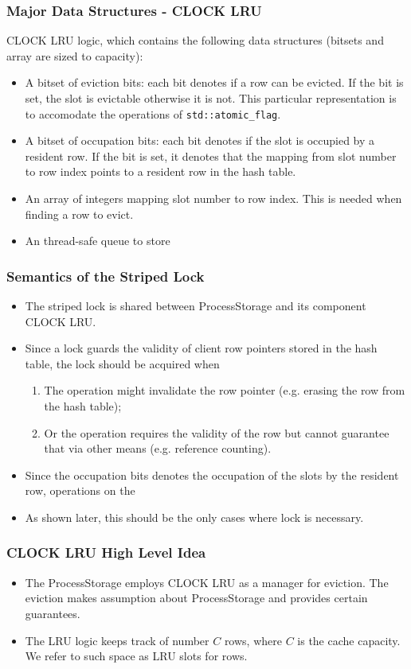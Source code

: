 \documentclass{beamer}
\begin{document}
\begin{frame}
\frametitle{Major Data Structures - CLOCK LRU}
CLOCK LRU logic, which contains the following data structures (bitsets and
 array are sized to capacity):
\begin{itemize}
\item A bitset of eviction bits: each bit denotes if a row can be evicted. If 
the bit is set, the slot is evictable otherwise it is not. This particular 
representation is to accomodate the operations of \texttt{std::atomic\_flag}.
\item A bitset of occupation bits: each bit denotes if the slot is occupied by a
resident row. If the bit is set, it denotes that the mapping from slot number
to row index points to a resident row in the hash table.
\item An array of integers mapping slot number to row index. This is needed when
finding a row to evict.
\item An thread-safe queue to store 
\end{itemize}

\end{frame}

\begin{frame}
\frametitle{Semantics of the Striped Lock}
\begin{itemize}
\item The striped lock is shared between ProcessStorage and its component CLOCK 
LRU.
\item Since a lock guards the validity of client row pointers stored in the hash
  table, the lock should be acquired when
\begin{enumerate}
\item The operation might invalidate the row pointer (e.g. erasing the row from 
  the hash table);
\item Or the operation requires the validity of the row but cannot guarantee that
via other means (e.g. reference counting).
\end{enumerate}
\item Since the occupation bits denotes the occupation of the slots by the resident
row, operations on the 
\item As shown later, this should be the only cases where lock is necessary.
\end{itemize}
\end{frame}

\begin{frame}
  \frametitle{CLOCK LRU High Level Idea}
\begin{itemize}
\item The ProcessStorage employs CLOCK LRU as a manager for eviction. The eviction makes 
assumption about ProcessStorage and provides certain guarantees.
\item The LRU logic keeps track of number $C$ rows, where $C$ is the cache capacity. We
refer to such space as LRU slots for rows. 
\end{itemize}
\end{frame}
\end{document}
